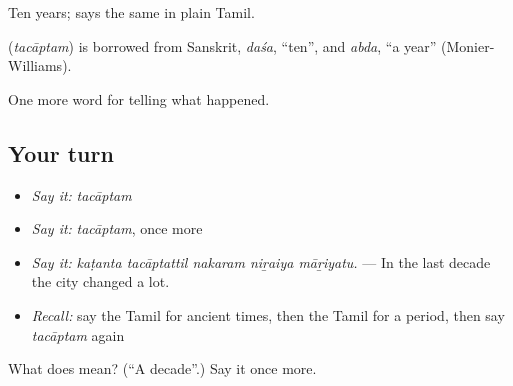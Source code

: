 Ten years;  says the same in plain Tamil.

\begin{cousinweb}
\textbf{} (\emph{tacāptam}) is borrowed from Sanskrit, \emph{daśa}, \textquotedblleft{}ten\textquotedblright{}, and \emph{abda}, \textquotedblleft{}a year\textquotedblright{} (Monier-Williams).
\end{cousinweb}

\begin{grammarlens}[title={What you've built}]
One more word for telling what happened.
\end{grammarlens}

\subsection*{Your turn}
\begin{itemize}
\raggedright
  \item \emph{Say it:} \emph{tacāptam}
  \item \emph{Say it:} \emph{tacāptam}, once more
  \item \emph{Say it:} \emph{kaṭanta tacāptattil nakaram niṟaiya māṟiyatu.} — In the last decade the city changed a lot.
  \item \emph{Recall:} say the Tamil for ancient times, then the Tamil for a period, then say \emph{tacāptam} again
\end{itemize}

\begin{tcolorbox}[breakable,colback=teal!4,colframe=teal!35!black,title={Before you move on}]
What does  mean? (\textquotedblleft{}A decade\textquotedblright{}.) Say it once more.
\end{tcolorbox}
